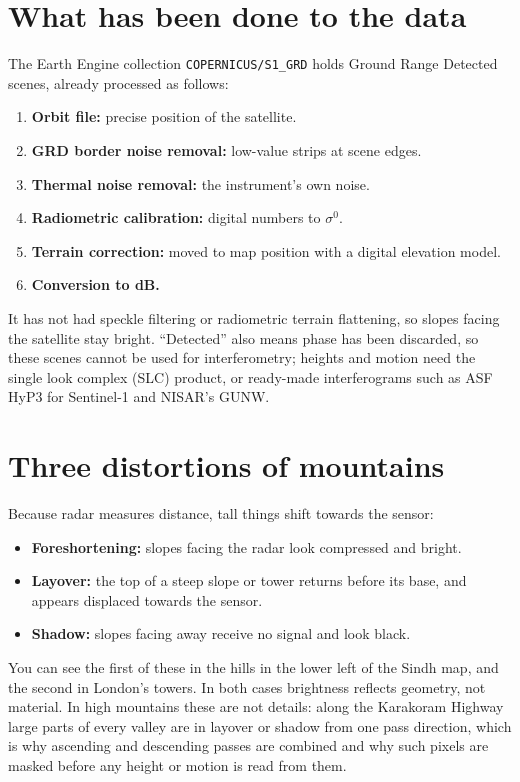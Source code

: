 \section{What has been done to the data}
The Earth Engine collection \texttt{COPERNICUS/S1\_GRD} holds Ground Range Detected scenes, already processed as follows:
\begin{enumerate}
\item \textbf{Orbit file:} precise position of the satellite.
\item \textbf{GRD border noise removal:} low-value strips at scene edges.
\item \textbf{Thermal noise removal:} the instrument's own noise.
\item \textbf{Radiometric calibration:} digital numbers to $\sigma^0$.
\item \textbf{Terrain correction:} moved to map position with a digital elevation model.
\item \textbf{Conversion to dB.}
\end{enumerate}
It has not had speckle filtering or radiometric terrain flattening, so slopes facing the satellite stay bright. ``Detected'' also means phase has been discarded, so these scenes cannot be used for interferometry; heights and motion need the single look complex (SLC) product, or ready-made interferograms such as ASF HyP3 for Sentinel-1 and NISAR's GUNW.

\section{Three distortions of mountains}
Because radar measures distance, tall things shift towards the sensor:
\begin{itemize}
\item \textbf{Foreshortening:} slopes facing the radar look compressed and bright.
\item \textbf{Layover:} the top of a steep slope or tower returns before its base, and appears displaced towards the sensor.
\item \textbf{Shadow:} slopes facing away receive no signal and look black.
\end{itemize}
You can see the first of these in the hills in the lower left of the Sindh map, and the second in London's towers. In both cases brightness reflects geometry, not material. In high mountains these are not details: along the Karakoram Highway large parts of every valley are in layover or shadow from one pass direction, which is why ascending and descending passes are combined and why such pixels are masked before any height or motion is read from them.

